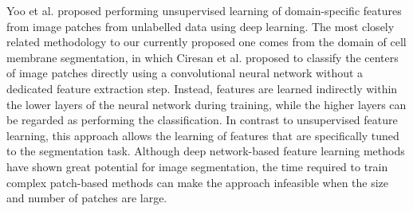 Yoo et al. \cite{yoo2014} proposed performing unsupervised learning of
domain-specific features from image patches from unlabelled data using deep
learning. The most closely related methodology to our currently proposed one
comes from the domain of cell membrane segmentation, in which Ciresan et al.
\cite{Ciresan2012} proposed to classify the centers of image patches directly
using a convolutional neural network \cite{LeCun1998} without a dedicated
feature extraction step. Instead, features are learned indirectly within the
lower layers of the neural network during training, while the higher layers can
be regarded as performing the classification. In contrast to unsupervised
feature learning, this approach allows the learning of features that are
specifically tuned to the segmentation task. Although deep network-based feature
learning methods have shown great potential for image segmentation, the time
required to train complex patch-based methods can make the approach infeasible
when the size and number of patches are large.


% 
% 
%   

